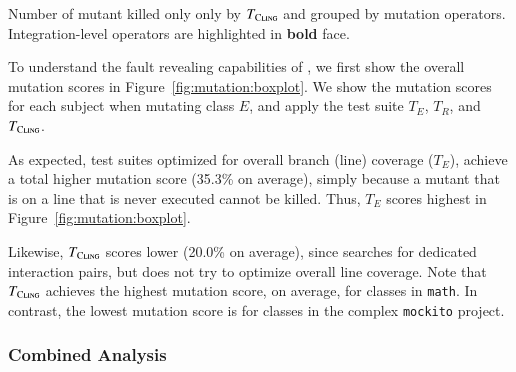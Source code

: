 \begin{table} [t]
	\center
	\caption{Number of mutant killed only only by $T_{\textsc{Cling}}$ and grouped by mutation operators. Integration-level operators are highlighted in \textbf{bold} face.}
	\label{tab:mutant-operators-table}
	
\end{table} 

To understand the fault revealing capabilities of \integration, we first show the overall mutation scores in Figure~\ref{fig:mutation:boxplot}.
We show the mutation scores for each subject when mutating class $E$, and apply the test suite $T_E$, $T_R$, and $T_{\textsc{Cling}}$.

As expected, test suites optimized for overall branch (line) coverage ($T_E$), achieve a total higher mutation score (35.3\% on average), simply because a mutant that is on a line that is never executed cannot be killed. 
Thus, $T_E$ scores highest in Figure~\ref{fig:mutation:boxplot}.

Likewise, $T_{\textsc{Cling}}$ scores lower (20.0\% on average), since \integration searches for dedicated interaction pairs, but does not try to optimize overall line coverage.
Note that $T_{\textsc{Cling}}$ achieves the highest mutation score, on average, for classes in \texttt{math}. In contrast, the lowest mutation score is for classes in the complex \texttt{mockito} project.
%

\subsubsection{Combined Analysis}

